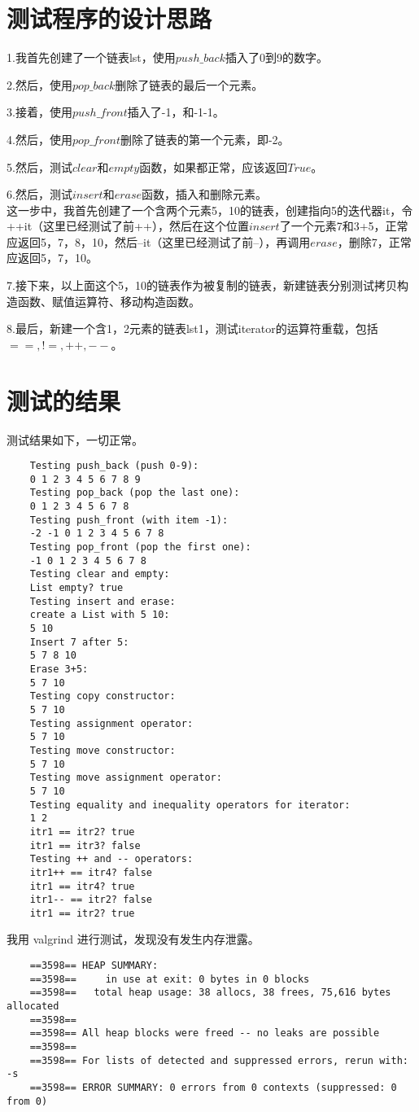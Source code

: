\documentclass[UTF8]{ctexart}
\begin{document}
\pagestyle{fancy}
\fancyhead{}

\section{测试程序的设计思路}

1.我首先创建了一个链表lst，使用$push\_back$插入了0到9的数字。\par
2.然后，使用$pop\_back$删除了链表的最后一个元素。\par
3.接着，使用$push\_front$插入了-1，和-1-1。\par
4.然后，使用$pop\_front$删除了链表的第一个元素，即-2。\par
5.然后，测试$clear$和$empty$函数，如果都正常，应该返回$True$。\par
6.然后，测试$insert$和$erase$函数，插入和删除元素。\\
这一步中，我首先创建了一个含两个元素5，10的链表，创建指向5的迭代器it，令++it（这里已经测试了前++），然后在这个位置$insert$了一个元素7和3+5，正常应返回5，7，8，10，然后--it（这里已经测试了前--），再调用$erase$，删除7，正常应返回5，7，10。\par
7.接下来，以上面这个5，10的链表作为被复制的链表，新建链表分别测试拷贝构造函数、赋值运算符、移动构造函数。\par
8.最后，新建一个含1，2元素的链表lst1，测试iterator的运算符重载，包括$==, !=, ++, --$。\par
\section{测试的结果}

测试结果如下，一切正常。
\begin{lstlisting}
    Testing push_back (push 0-9):
    0 1 2 3 4 5 6 7 8 9
    Testing pop_back (pop the last one):
    0 1 2 3 4 5 6 7 8
    Testing push_front (with item -1):
    -2 -1 0 1 2 3 4 5 6 7 8
    Testing pop_front (pop the first one):
    -1 0 1 2 3 4 5 6 7 8
    Testing clear and empty:
    List empty? true
    Testing insert and erase:
    create a List with 5 10:
    5 10
    Insert 7 after 5:
    5 7 8 10
    Erase 3+5:
    5 7 10
    Testing copy constructor:
    5 7 10
    Testing assignment operator:
    5 7 10
    Testing move constructor:
    5 7 10
    Testing move assignment operator:
    5 7 10
    Testing equality and inequality operators for iterator:
    1 2
    itr1 == itr2? true
    itr1 == itr3? false
    Testing ++ and -- operators:
    itr1++ == itr4? false
    itr1 == itr4? true
    itr1-- == itr2? false
    itr1 == itr2? true
\end{lstlisting}
我用 valgrind 进行测试，发现没有发生内存泄露。
\begin{lstlisting}
    ==3598== HEAP SUMMARY:
    ==3598==     in use at exit: 0 bytes in 0 blocks
    ==3598==   total heap usage: 38 allocs, 38 frees, 75,616 bytes allocated
    ==3598== 
    ==3598== All heap blocks were freed -- no leaks are possible
    ==3598== 
    ==3598== For lists of detected and suppressed errors, rerun with: -s
    ==3598== ERROR SUMMARY: 0 errors from 0 contexts (suppressed: 0 from 0)    
\end{lstlisting}
\end{document}
